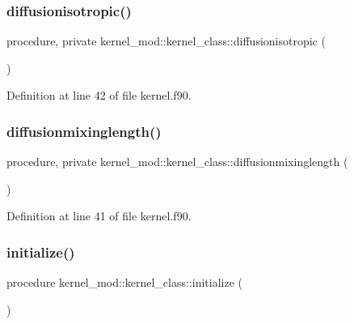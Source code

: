 \subsubsection{\texorpdfstring{diffusionisotropic()}{diffusionisotropic()}}
{\footnotesize\ttfamily procedure, private kernel\+\_\+mod\+::kernel\+\_\+class\+::diffusionisotropic (\begin{DoxyParamCaption}{ }\end{DoxyParamCaption})\hspace{0.3cm}{\ttfamily [private]}}



Definition at line 42 of file kernel.\+f90.

\mbox{\label{structkernel__mod_1_1kernel__class_a1ba4a72f6cfb6f6d9462d89714d035d5}} 
\subsubsection{\texorpdfstring{diffusionmixinglength()}{diffusionmixinglength()}}
{\footnotesize\ttfamily procedure, private kernel\+\_\+mod\+::kernel\+\_\+class\+::diffusionmixinglength (\begin{DoxyParamCaption}{ }\end{DoxyParamCaption})\hspace{0.3cm}{\ttfamily [private]}}



Definition at line 41 of file kernel.\+f90.

\mbox{\label{structkernel__mod_1_1kernel__class_a86a1de717f53f3276df28443b4495cc7}} 
\subsubsection{\texorpdfstring{initialize()}{initialize()}}
{\footnotesize\ttfamily procedure kernel\+\_\+mod\+::kernel\+\_\+class\+::initialize (\begin{DoxyParamCaption}{ }\end{DoxyParamCaption})}




